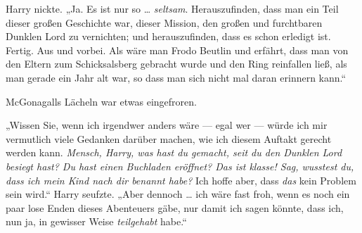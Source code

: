 Harry nickte.
„Ja. Es ist nur so … \emph{seltsam}. Herauszufinden, dass man ein Teil dieser großen Geschichte war, dieser Mission, den großen und furchtbaren Dunklen Lord zu vernichten; und herauszufinden, dass es schon erledigt ist. Fertig. Aus und vorbei. Als wäre man Frodo Beutlin und erfährt, dass man von den Eltern zum Schicksalsberg gebracht wurde und den Ring reinfallen ließ, als man gerade ein Jahr alt war, so dass man sich nicht mal daran erinnern kann.“

McGonagalls Lächeln war etwas eingefroren.

„Wissen Sie, wenn ich irgendwer anders wäre — egal wer — würde ich mir vermutlich viele Gedanken darüber machen, wie ich diesem Auftakt gerecht werden kann. \emph{Mensch, Harry, was hast du gemacht, seit du den Dunklen Lord besiegt hast? Du hast einen Buchladen eröffnet? Das ist klasse! Sag, wusstest du, dass ich mein Kind nach dir benannt habe?} Ich hoffe aber, dass \emph{das} kein Problem sein wird.“ Harry seufzte.
„Aber dennoch … ich wäre fast froh, wenn es noch ein paar lose Enden dieses Abenteuers gäbe, nur damit ich sagen könnte, dass ich, nun ja, in gewisser Weise \emph{teilgehabt} habe.“

